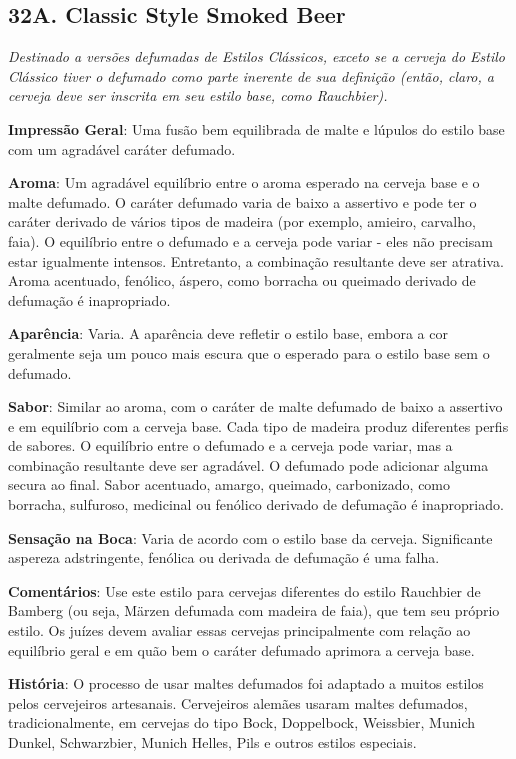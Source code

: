 \subsection*{32A. Classic Style Smoked Beer}
\textit{Destinado a versões defumadas de Estilos Clássicos, exceto se a cerveja do Estilo Clássico tiver o defumado como parte inerente de sua definição (então, claro, a cerveja deve ser inscrita em seu estilo base, como Rauchbier).}

\textbf{Impressão Geral}: Uma fusão bem equilibrada de malte e lúpulos do estilo base com um agradável caráter defumado.

\textbf{Aroma}: Um agradável equilíbrio entre o aroma esperado na cerveja base e o malte defumado. O caráter defumado varia de baixo a assertivo e pode ter o caráter derivado de vários tipos de madeira (por exemplo, amieiro, carvalho, faia). O equilíbrio entre o defumado e a cerveja pode variar - eles não precisam estar igualmente intensos. Entretanto, a combinação resultante deve ser atrativa. Aroma acentuado, fenólico, áspero, como borracha ou queimado derivado de defumação é inapropriado.

\textbf{Aparência}: Varia. A aparência deve refletir o estilo base, embora a cor geralmente seja um pouco mais escura que o esperado para o estilo base sem o defumado.

\textbf{Sabor}: Similar ao aroma, com o caráter de malte defumado de baixo a assertivo e em equilíbrio com a cerveja base. Cada tipo de madeira produz diferentes perfis de sabores. O equilíbrio entre o defumado e a cerveja pode variar, mas a combinação resultante deve ser agradável. O defumado pode adicionar alguma secura ao final. Sabor acentuado, amargo, queimado, carbonizado, como borracha, sulfuroso, medicinal ou fenólico derivado de defumação é inapropriado.

\textbf{Sensação na Boca}: Varia de acordo com o estilo base da cerveja. Significante aspereza adstringente, fenólica ou derivada de defumação é uma falha.

\textbf{Comentários}: Use este estilo para cervejas diferentes do estilo Rauchbier de Bamberg (ou seja, Märzen defumada com madeira de faia), que tem seu próprio estilo. Os juízes devem avaliar essas cervejas principalmente com relação ao equilíbrio geral e em quão bem o caráter defumado aprimora a cerveja base.

\textbf{História}: O processo de usar maltes defumados foi adaptado a muitos estilos pelos cervejeiros artesanais. Cervejeiros alemães usaram maltes defumados, tradicionalmente, em cervejas do tipo Bock, Doppelbock, Weissbier, Munich Dunkel, Schwarzbier, Munich Helles, Pils e outros estilos especiais.

